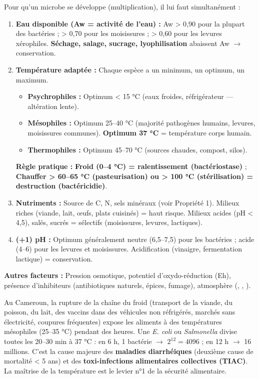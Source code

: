 \documentclass[11pt]{article}
\begin{document}
\begin{aretenir}
Pour qu'un microbe se développe (multiplication), il lui faut simultanément :
\begin{enumerate}
    \item \textbf{Eau disponible (Aw = activité de l'eau) :} Aw > 0,90 pour la plupart des bactéries ; > 0,70 pour les moisissures ; > 0,60 pour les levures xérophiles. \textbf{Séchage, salage, sucrage, lyophilisation} abaissent Aw $\rightarrow$ conservation.
    \item \textbf{Température adaptée :} Chaque espèce a un minimum, un optimum, un maximum.
        \begin{itemize}
            \item \textbf{Psychrophiles :} Optimum < 15 °C (eaux froides, réfrigérateur — altération lente).
            \item \textbf{Mésophiles :} Optimum 25--40 °C (majorité pathogènes humains, levures, moisissures communes). \textbf{Optimum 37 °C} = température corps humain.
            \item \textbf{Thermophiles :} Optimum 45--70 °C (sources chaudes, compost, silos).
        \end{itemize}
        \textbf{Règle pratique :} \textbf{Froid (0--4 °C) = ralentissement (bactériostase)} ; \textbf{Chauffer > 60--65 °C (pasteurisation) ou > 100 °C (stérilisation) = destruction (bactéricidie)}.
    \item \textbf{Nutriments :} Source de C, N, sels minéraux (voir Propriété 1). Milieux riches (viande, lait, œufs, plats cuisinés) = haut risque. Milieux acides (pH < 4,5), salés, sucrés = sélectifs (moisissures, levures, lactiques).
    \item \textbf{(+1) pH :} Optimum généralement neutre (6,5--7,5) pour les bactéries ; acide (4--6) pour les levures et moisissures. Acidification (vinaigre, fermentation lactique) = conservation.
\end{enumerate}
\textbf{Autres facteurs :} Pression osmotique, potentiel d'oxydo-réduction (Eh), présence d'inhibiteurs (antibiotiques naturels, épices, fumage), atmosphère (, , ).
\end{aretenir}

\begin{savaistu}
Au Cameroun, la rupture de la chaîne du froid (transport de la viande, du poisson, du lait, des vaccins dans des véhicules non réfrigérés, marchés sans électricité, coupures fréquentes) expose les aliments à des températures mésophiles (25--35 °C) pendant des heures. Une \emph{E. coli} ou \emph{Salmonella} divise toutes les 20--30 min à 37 °C : en 6 h, 1 bactérie $\rightarrow$ $2^{12} = 4096$ ; en 12 h $\rightarrow$ 16 millions. C'est la cause majeure des \textbf{maladies diarrhéiques} (deuxième cause de mortalité < 5 ans) et des \textbf{toxi-infections alimentaires collectives (TIAC)}. La maîtrise de la température est le levier n°1 de la sécurité alimentaire.
\end{savaistu}
\end{document}
